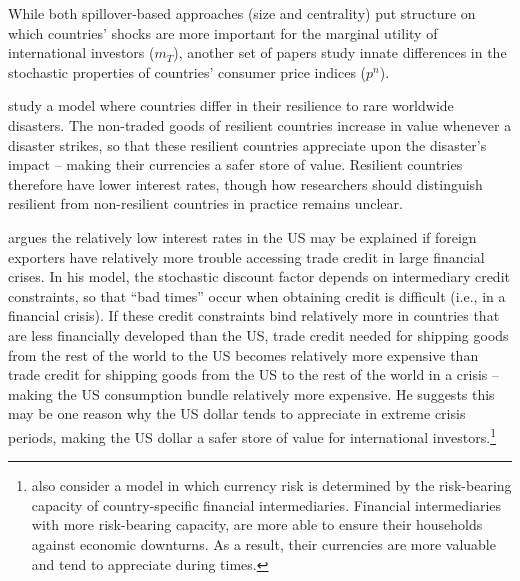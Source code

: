 \documentclass{ar-1col}
\begin{document}
While both spillover-based approaches (size and centrality) put structure on which countries' shocks are more important for the marginal utility of international investors ($m_T$), another set of papers study innate differences in the stochastic properties of countries' consumer price indices ($p^n$).

\citet{FarhiGabaix2016} study a model where countries differ in their resilience to rare worldwide disasters. The non-traded goods of resilient countries increase in value whenever a disaster strikes, so that these resilient countries appreciate upon the disaster's impact -- making their currencies a safer store of value. Resilient countries therefore have lower interest rates, though how researchers should distinguish resilient from non-resilient countries in practice remains unclear.

\citet{Maggiori2013} argues the relatively low interest rates in the US may be explained if foreign exporters have relatively more trouble accessing trade credit in large financial crises. In his model, the stochastic discount factor depends on intermediary credit constraints, so that ``bad times'' occur when obtaining credit is difficult (i.e., in a financial crisis). If these credit constraints bind relatively more in countries that are less financially developed than the US, trade credit needed for shipping goods from the rest of the world to the US becomes relatively more expensive than trade credit for shipping goods from the US to the rest of the world in a crisis -- making the US consumption bundle relatively more expensive. He suggests this may be one reason why the US dollar tends to appreciate in extreme crisis periods, making the US dollar a safer store of value for international investors.\footnote{\citet{MalamudSchripf2020} also consider a model in which currency risk is determined by the risk-bearing capacity of country-specific financial intermediaries. Financial intermediaries with more risk-bearing capacity, are more able to ensure their households against economic downturns. As a result, their currencies are more valuable and tend to appreciate during times.}
\end{document}
